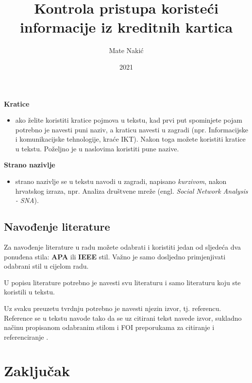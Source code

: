 \documentclass{foi}
\title{Kontrola pristupa koristeći informacije iz kreditnih kartica}
\author{Mate Nakić}
\date{2021}
\begin{document}
\maketitle

\tableofcontents

\pagestyle{plain}

\begin{flushleft}\textbf{Kratice}\end{flushleft}   
\begin{itemize}
    \item ako želite koristiti kratice pojmova u tekstu, kad prvi put spominjete pojam potrebno je navesti puni naziv, a kraticu navesti u zagradi (npr. Informacijske i komunikacijske tehnologije, kraće IKT). Nakon toga možete koristiti kratice u tekstu. Poželjno je u naslovima koristiti pune nazive.
\end{itemize}

\begin{flushleft}\textbf{Strano nazivlje}\end{flushleft}   
\begin{itemize}
    \item strano nazivlje se u tekstu navodi u zagradi, napisano \textit{kurzivom}, nakon hrvatskog izraza, npr. Analiza društvene mreže (engl. \textit{Social Network Analysis - SNA}).
\end{itemize}

\section{Navođenje literature}

Za navođenje literature u radu možete odabrati i koristiti jedan od sljedeća dva ponuđena stila: \textbf{APA} ili \textbf{IEEE} stil. Važno je samo dosljedno primjenjivati odabrani stil u cijelom radu.

U popisu literature potrebno je navesti svu literaturu i samo literaturu koju ste koristili u tekstu.

Uz svaku preuzetu tvrdnju potrebno je navesti njezin izvor, tj. referencu. Reference se u tekstu navode tako da se uz citirani tekst navede izvor, sukladno načinu propisanom odabranim stilom i FOI preporukama za citiranje i referenciranje \cite{SchattenEtAl2016roadmap}.

\chapter{Zaključak}
\end{document}
